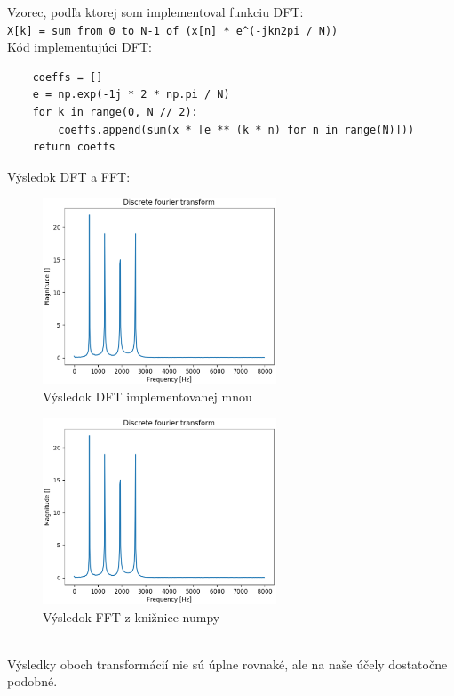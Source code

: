 \documentclass{article}
\begin{document}
  Vzorec, podľa ktorej som implementoval funkciu DFT: \\
  \verb|X[k] = sum from 0 to N-1 of (x[n] * e^(-jkn2pi / N))| \\

  \noindent
  Kód implementujúci DFT:
  \begin{verbatim}
    coeffs = []
    e = np.exp(-1j * 2 * np.pi / N)
    for k in range(0, N // 2):
        coeffs.append(sum(x * [e ** (k * n) for n in range(N)]))
    return coeffs
  \end{verbatim}

  \newpage
  Výsledok DFT a FFT: \\
  \begin{figure}[h]
    \centering
    \includegraphics[width=0.62\textwidth]{src/dft.eps}
    \caption{Výsledok DFT implementovanej mnou}
  \end{figure}
  \begin{figure}[h]
    \centering
    \includegraphics[width=0.62\textwidth]{src/fft.eps}
    \caption{Výsledok FFT z knižnice numpy}
  \end{figure}
  \\
  Výsledky oboch transformácií nie sú úplne rovnaké, ale na naše účely 
  dostatočne podobné.
\end{document}
